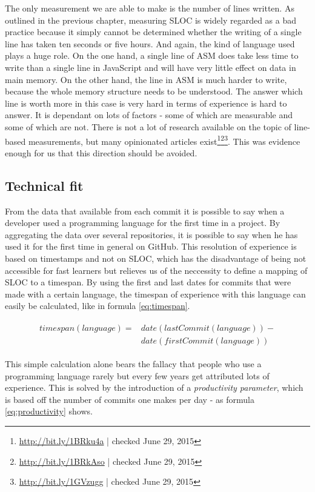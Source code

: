 The only measurement we are able to make is the number of lines written. As outlined in the previous chapter, measuring SLOC is widely regarded as a bad practice because it simply cannot be determined whether the writing of a single line has taken ten seconds or five hours. And again, the kind of language used plays a huge role. On the one hand, a single line of ASM does take less time to write than a single line in JavaScript and will have very little effect on data in main memory. On the other hand, the line in ASM is much harder to write, because the whole memory structure needs to be understood. The answer which line is worth more in this case is very hard in terms of experience is hard to answer. It is dependant on lots of factors - some of which are measurable and some of which are not. There is not a lot of research available on the topic of line-based measurements, but many opinionated articles exist\cite{mlya:2012}\footnote{\url{http://bit.ly/1BRku4a} | checked June 29, 2015}\footnote{\url{http://bit.ly/1BRkAso} | checked June 29, 2015}\footnote{\url{http://bit.ly/1GVzugg} | checked June 29, 2015}. This was evidence enough for us that this direction should be avoided.

\subsection{Technical fit}\label{sec:technicalfit}
From the data that available from each commit it is possible to say when a developer used a programming language for the first time in a project. By aggregating the data over several repositories, it is possible to say when he has used it for the first time in general on GitHub. This resolution of experience is based on timestamps and not on SLOC, which has the disadvantage of being not accessible for fast learners but relieves us of the neccessity to define a mapping of SLOC to a timespan. By using the first and last dates for commits that were made with a certain language, the timespan of experience with this language can easily be calculated, like in formula \ref{eq:timespan}.

\begin{align}
\begin{split}\label{eq:timespan}
timespan(language) ={}& date(lastCommit(language)) - \\
                      & date(firstCommit(language))
\end{split}
\end{align}

This simple calculation alone bears the fallacy that people who use a programming language rarely but every few years get attributed lots of experience. This is solved by the introduction of a \textit{productivity parameter}, which is based off the number of commits one makes per day - as formula \ref{eq:productivity} shows.

